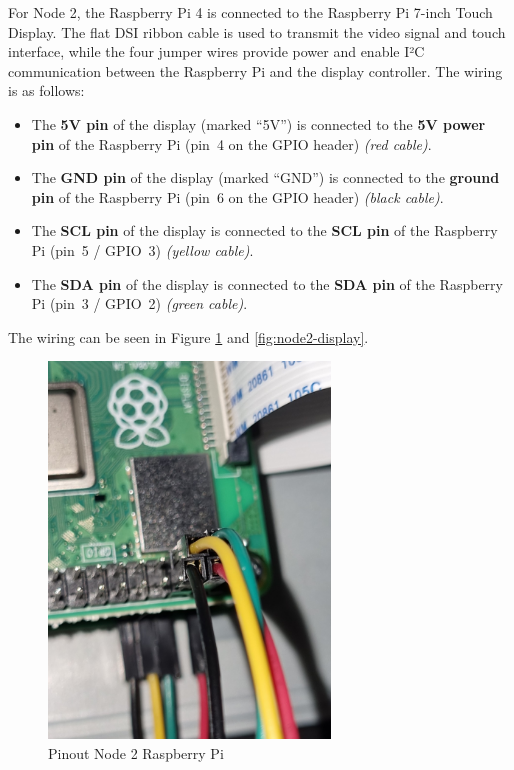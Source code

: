 For Node 2, the Raspberry Pi 4 is connected to the Raspberry Pi 7-inch Touch Display.  
The flat DSI ribbon cable is used to transmit the video signal and touch interface, while the four jumper wires provide power and enable I²C communication between the Raspberry Pi and the display controller. The wiring is as follows:

\begin{itemize}
    \item The \textbf{5V pin} of the display (marked ``5V'') is connected to the \textbf{5V power pin} of the Raspberry Pi (pin~4 on the GPIO header) \emph{(red cable)}.
    \item The \textbf{GND pin} of the display (marked ``GND'') is connected to the \textbf{ground pin} of the Raspberry Pi (pin~6 on the GPIO header) \emph{(black cable)}.
    \item The \textbf{SCL pin} of the display is connected to the \textbf{SCL pin} of the Raspberry Pi (pin~5 / GPIO~3) \emph{(yellow cable)}.
    \item The \textbf{SDA pin} of the display is connected to the \textbf{SDA pin} of the Raspberry Pi (pin~3 / GPIO~2) \emph{(green cable)}.
\end{itemize}

The wiring can be seen in Figure \ref{fig:node2-raspy} and \ref{fig:node2-display}.

\begin{figure}[h]
	\includegraphics[height=100mm]{images/node2-raspy.jpg}
	\centering
	\caption{Pinout Node 2 Raspberry Pi}
	\label{fig:node2-raspy}
\end{figure}


